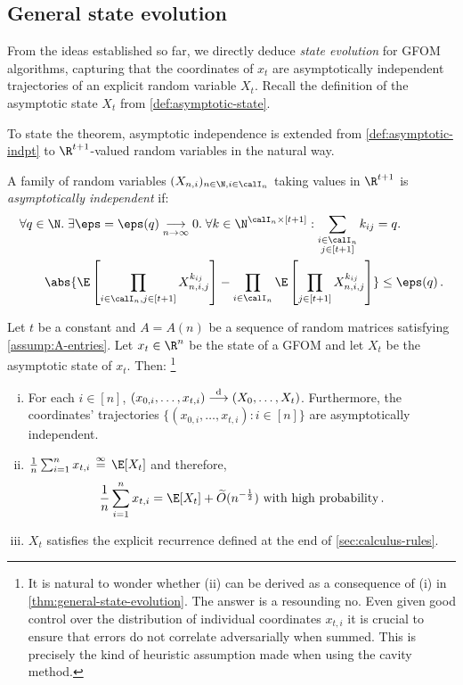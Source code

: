\documentclass[12pt]{article}
\newcommand{\eqinf}{\,\overset{\infty}{=}\,}
\renewcommand{\tod}{\overset{\textnormal{d}}{\longrightarrow}}
\begin{document}
\subsection{General state evolution}
\label{sec:asymptotic-space}

From the ideas established so far, we directly deduce \emph{state evolution} for GFOM algorithms, capturing that
the coordinates of $x_t$ are asymptotically independent trajectories
of an explicit random variable $X_t$.
Recall the definition of the asymptotic state $X_t$ from \cref{def:asymptotic-state}.

To state the theorem, asymptotic independence is extended from \cref{def:asymptotic-indpt} to $\R^{t+1}$-valued random variables
in the natural way. 
\begin{definition}
    A family of random variables $(X_{n,i})_{n\in\N,i\in \calI_n}$ taking values in $\R^{t+1}$ is \textit{asymptotically independent} if:
    \begin{align*} 
    &\forall q \in \N.\; \exists \eps=\eps(q) \underset{n\to\infty}{\longrightarrow} 0. \; \forall k  \in \N^{\calI_n\times [t+1]} : \sum_{\substack{i \in \calI_n\\ j \in [t+1]}} k_{ij} = q.\;\\
    &\qquad\abs{\E\left[ \prod_{\substack{i \in \calI_n, j \in [t+1]}} X_{n,i,j}^{k_{ij}}\right] - \prod_{i \in \calI_n}\E\left[\prod_{j \in [t+1]} X_{n,i,j}^{k_{ij}}\right]} \le \eps(q)\,.
    \end{align*}
\end{definition}

\begin{theorem}
    \label{thm:general-state-evolution}
    Let $t$ be a constant and $A = A(n)$ be a sequence of random matrices satisfying \cref{assump:A-entries}. Let $x_t\in \R^n$ be the state of a GFOM and let $X_t$ be the asymptotic state of $x_t$. Then: \footnote{It is natural to wonder whether (ii) can be derived as a consequence of (i) in \cref{thm:general-state-evolution}. The answer is a resounding no. Even given good control over the distribution of individual coordinates $x_{t,i}$ it is crucial to ensure that errors do not correlate adversarially when summed. This is precisely the kind of heuristic assumption made when using the cavity method.}
    \begin{enumerate}[(i)]
        \item For each $i \in [n]$, $(x_{0,i}, \dots, x_{t,i}) \tod (X_0, \dots, X_t)$.
        Furthermore, the coordinates' trajectories $\{(x_{0,i},\dots, x_{t,i}) : i \in [n]\}$ are asymptotically independent.
        \item $\frac{1}{n} \sum_{i = 1}^n x_{t,i} \eqinf \E[X_t]$ and therefore,
    \[
        \frac{1}{n} \sum_{i = 1}^n x_{t,i} = \E[X_t] + \widetilde{O}(n^{-\frac 1 2})\text{ with high probability}\,.
    \]
        \item $X_t$ satisfies the explicit recurrence defined at the end of \cref{sec:calculus-rules}.
    \end{enumerate}
\end{theorem}
\end{document}
